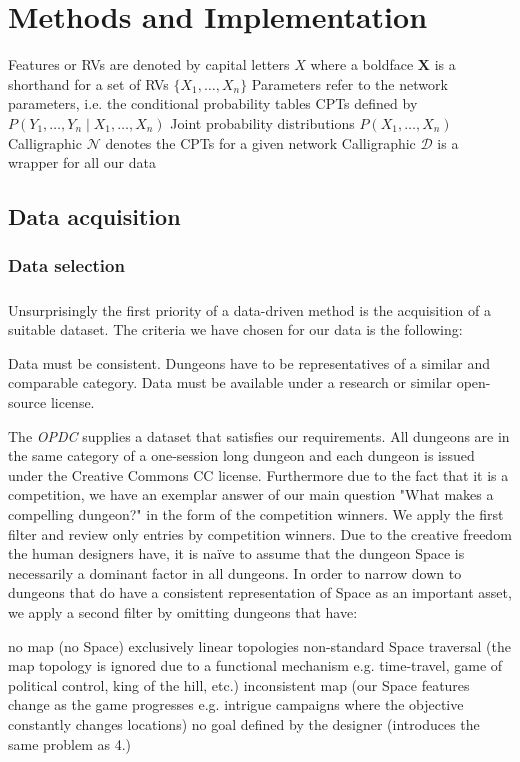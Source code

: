 \documentclass{UoYCSproject}
\begin{document}
\chapter{Methods and Implementation}
Features or RVs are denoted by capital letters \(X\) where a boldface \(\boldsymbol{X}\) is a shorthand for a set of RVs \(\{X_1, \ldots, X_n\}\)
Parameters refer to the network parameters, i.e. the conditional probability tables CPTs defined by \(P(Y_1, \ldots, Y_n \mid X_1, \ldots , X_n)\)
Joint probability distributions \(P(X_1, \ldots , X_n)\)
Calligraphic \(\mathcal{N}\) denotes the CPTs for a given network
Calligraphic \(\mathcal{D}\) is a wrapper for all our data

\section{Data acquisition}
\subsection{Data selection} %
\paragraph{}
Unsurprisingly the first priority of a data-driven method is the acquisition of a suitable dataset. The criteria we have chosen for our data is the following:
\begin{outline}[enumerate]
  \1 Data must be consistent. Dungeons have to be representatives of a similar and comparable category.
  \1 Data must be available under a research or similar open-source license.
\end{outline}
The \textit{OPDC} supplies a dataset that satisfies our requirements. All dungeons are in the same category of a one-session long dungeon and each dungeon is issued under the Creative Commons CC license. Furthermore due to the fact that it is a competition, we have an exemplar answer of our main question "What makes a compelling dungeon?" in the form of the competition winners. We apply the first filter and review only entries by competition winners. Due to the creative freedom the human designers have, it is na\"{i}ve to assume that the dungeon Space is necessarily a dominant factor in all dungeons. In order to narrow down to dungeons that do have a consistent representation of Space as an important asset, we apply a second filter by omitting dungeons that have:
\begin{outline}[enumerate]
  \1 no map (no Space)
  \1 exclusively linear topologies
  \1 non-standard Space traversal (the map topology is ignored due to a functional mechanism e.g. time-travel, game of political control, king of the hill, etc.)
  \1 inconsistent map (our Space features change as the game progresses e.g. intrigue campaigns where the objective constantly changes locations)
  \1 no goal defined by the designer (introduces the same problem as 4.)
\end{outline}
\end{document}

